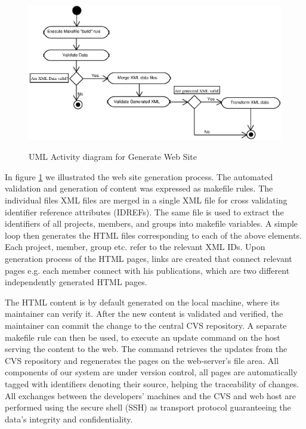 \documentclass[10pt]{article}
\begin{document}
\begin{figure}[h!]
\includegraphics[scale=0.6]{generate-web-site}
\label{fig:generate-web-site}
\caption{UML Activity diagram for Generate Web Site}
\end{figure}

In figure \ref{fig:generate-web-site} we illustrated the web site generation process.
The automated validation and generation of content was
expressed as makefile rules.
The individual files {\sc XML} files are merged in a
single {\sc XML} file for cross validating identifier
reference attributes ({\sc IDREFs}).
The same file is used to extract the identifiers of
all projects, members, and groups into makefile
variables.
A simple loop then generates the {\sc HTML} files
corresponding to each of the above elements.
Each project, member, group etc. refer to the relevant {\sc XML IDs}.
Upon generation process of the {\sc HTML} pages, links are created that
connect relevant pages e.g. each member connect with his publications, 
which are two different independently generated {\sc HTML} pages.

The {\sc HTML} content is by default generated on the
local machine, where its maintainer can verify it.
After the new content is validated and verified,
the maintainer can commit the change to the central {\sc CVS} repository. 
A separate makefile rule can then be used,
to execute an update command on the
host serving the content to the web.
The command retrieves the updates from the {\sc CVS}
repository and regenerates the pages on the web-server's
file area.
All components of our system are under version control,
all pages are automatically tagged with identifiers
denoting their source, helping the traceability of changes.
All exchanges between the developers' machines and the
{\sc CVS} and web host are performed using the secure
shell ({\sc SSH}) as transport protocol guaranteeing the data's integrity
and confidentiality.
\end{document}
